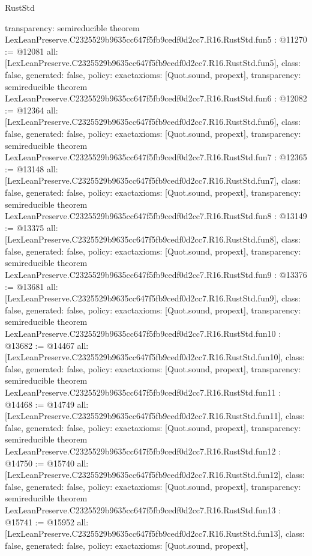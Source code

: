 \begin{lexlean}{RustStd}
\begin{coremodule}
{  transparency: semireducible
}
theorem LexLeanPreserve.C2325529b9635cc647f5fb9cedf0d2cc7.R16.RustStd.fun5 : @11270 := @12081 {
  all: [LexLeanPreserve.C2325529b9635cc647f5fb9cedf0d2cc7.R16.RustStd.fun5],
  class: false,
  generated: false,
  policy: exact{axioms: [Quot.sound, propext]},
  transparency: semireducible
}
theorem LexLeanPreserve.C2325529b9635cc647f5fb9cedf0d2cc7.R16.RustStd.fun6 : @12082 := @12364 {
  all: [LexLeanPreserve.C2325529b9635cc647f5fb9cedf0d2cc7.R16.RustStd.fun6],
  class: false,
  generated: false,
  policy: exact{axioms: [Quot.sound, propext]},
  transparency: semireducible
}
theorem LexLeanPreserve.C2325529b9635cc647f5fb9cedf0d2cc7.R16.RustStd.fun7 : @12365 := @13148 {
  all: [LexLeanPreserve.C2325529b9635cc647f5fb9cedf0d2cc7.R16.RustStd.fun7],
  class: false,
  generated: false,
  policy: exact{axioms: [Quot.sound, propext]},
  transparency: semireducible
}
theorem LexLeanPreserve.C2325529b9635cc647f5fb9cedf0d2cc7.R16.RustStd.fun8 : @13149 := @13375 {
  all: [LexLeanPreserve.C2325529b9635cc647f5fb9cedf0d2cc7.R16.RustStd.fun8],
  class: false,
  generated: false,
  policy: exact{axioms: [Quot.sound, propext]},
  transparency: semireducible
}
theorem LexLeanPreserve.C2325529b9635cc647f5fb9cedf0d2cc7.R16.RustStd.fun9 : @13376 := @13681 {
  all: [LexLeanPreserve.C2325529b9635cc647f5fb9cedf0d2cc7.R16.RustStd.fun9],
  class: false,
  generated: false,
  policy: exact{axioms: [Quot.sound, propext]},
  transparency: semireducible
}
theorem LexLeanPreserve.C2325529b9635cc647f5fb9cedf0d2cc7.R16.RustStd.fun10 : @13682 := @14467 {
  all: [LexLeanPreserve.C2325529b9635cc647f5fb9cedf0d2cc7.R16.RustStd.fun10],
  class: false,
  generated: false,
  policy: exact{axioms: [Quot.sound, propext]},
  transparency: semireducible
}
theorem LexLeanPreserve.C2325529b9635cc647f5fb9cedf0d2cc7.R16.RustStd.fun11 : @14468 := @14749 {
  all: [LexLeanPreserve.C2325529b9635cc647f5fb9cedf0d2cc7.R16.RustStd.fun11],
  class: false,
  generated: false,
  policy: exact{axioms: [Quot.sound, propext]},
  transparency: semireducible
}
theorem LexLeanPreserve.C2325529b9635cc647f5fb9cedf0d2cc7.R16.RustStd.fun12 : @14750 := @15740 {
  all: [LexLeanPreserve.C2325529b9635cc647f5fb9cedf0d2cc7.R16.RustStd.fun12],
  class: false,
  generated: false,
  policy: exact{axioms: [Quot.sound, propext]},
  transparency: semireducible
}
theorem LexLeanPreserve.C2325529b9635cc647f5fb9cedf0d2cc7.R16.RustStd.fun13 : @15741 := @15952 {
  all: [LexLeanPreserve.C2325529b9635cc647f5fb9cedf0d2cc7.R16.RustStd.fun13],
  class: false,
  generated: false,
  policy: exact{axioms: [Quot.sound, propext]},
}
\end{coremodule}
\end{lexlean}
